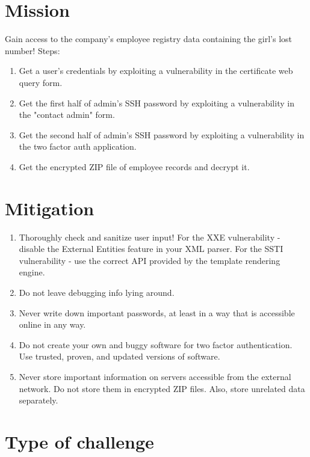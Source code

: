 \documentclass[a4paper]{article}
\begin{document}
\section{Mission}

Gain access to the company's employee registry data containing the
girl's lost number! Steps:

\begin{enumerate}
  \item Get a user's credentials by exploiting a vulnerability in the certificate web query form.
  \item Get the first half of admin's SSH password by exploiting a vulnerability in the "contact admin" form.
  \item Get the second half of admin's SSH password by exploiting a vulnerability in the two factor auth application.
  \item Get the encrypted ZIP file of employee records and decrypt it.
\end{enumerate}

\section{Mitigation}

\begin{enumerate}
  \item Thoroughly check and sanitize user input!
        For the XXE vulnerability - disable the External Entities feature in your XML parser.
        For the SSTI vulnerability - use the correct API provided by the template rendering engine.
  \item Do not leave debugging info lying around.
  \item Never write down important passwords,
        at least in a way that is accessible online in any way.
  \item Do not create your own and buggy software for two factor authentication. Use
        trusted, proven, and updated versions of software.
  \item Never store important information on servers accessible from the
        external network. Do not store them in encrypted ZIP files. Also,
        store unrelated data separately.
\end{enumerate}

\section{Type of challenge}
\end{document}
